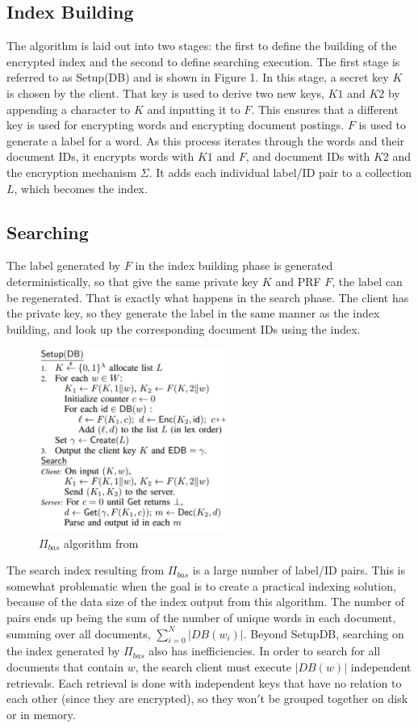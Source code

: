 \documentclass{sig-alternate-05-2015}
\begin{document}
\subsection{Index Building}
The algorithm is laid out into two stages: the first to define the building of the encrypted index and the second to define searching execution. The first stage is referred to as Setup(DB) and is shown in Figure 1. In this stage, a secret key $K$ is chosen by the client. That key is used to derive two new keys, $K1$ and $K2$ by appending a character to $K$ and inputting it to $F$. This ensures that a different key is used for encrypting words and encrypting document postings. $F$ is used to generate a label for a word. As this process iterates through the words and their document IDs, it encrypts words with $K1$ and $F$, and document IDs with $K2$ and the encryption mechanism $\Sigma$. It adds each individual label/ID pair to a collection $L$, which becomes the index.


\subsection{Searching} The label generated by $F$ in the index building phase is generated deterministically, so that give the same private key $K$ and PRF $F$, the label can be regenerated. That is exactly what happens in the search phase. The client has the private key, so they generate the label in the same manner as the index building, and look up the corresponding document IDs using the index.

\begin{figure}[H]
\includegraphics[height=6cm]{PiBaseAlgorithm}
\caption{ $\Pi_{bas}$ algorithm from \cite{davidcashetal.2014}}
\label{fig:pibase-algorithm}
\end{figure}


The search index resulting from $\Pi_{bas}$ is a large number of label/ID pairs. This is somewhat problematic when the goal is to create a practical indexing solution, because of the data size of the index output from this algorithm. The number of pairs ends up being the sum of the number of unique words in each document, summing over all documents, $\sum_{i=0}^{N} |DB(w_i)|$. Beyond SetupDB, searching on the index generated by $\Pi_{bas}$ also has inefficiencies. In order to search for all documents that contain $w$, the search client must execute $|DB(w)|$ independent retrievals. Each retrieval is done with independent keys that have no relation to each other (since they are encrypted), so they won$'$t be grouped together on disk or in memory.
\end{document}
